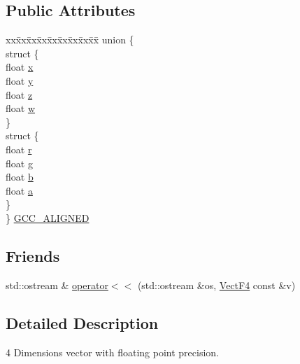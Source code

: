 \subsection*{Public Attributes}
\begin{DoxyCompactItemize}
\item 
\begin{tabbing}
xx\=xx\=xx\=xx\=xx\=xx\=xx\=xx\=xx\=\kill
union \{\\
\>struct \{\\
\>\>float \hyperlink{classVectF4_a0eae0277b6f418b6455a45030824c271}{x}\\
\>\>float \hyperlink{classVectF4_a9c3f2f0998e49e2039768ce8e64c1f91}{y}\\
\>\>float \hyperlink{classVectF4_a7fd880f9637591664713a14796cc06cd}{z}\\
\>\>float \hyperlink{classVectF4_a9e59fa7a69f80b5af58c3bf358ba7b4a}{w}\\
\>\} \\
\>struct \{\\
\>\>float \hyperlink{classVectF4_af832cf6038bfe6de1ca52cefed6f8184}{r}\\
\>\>float \hyperlink{classVectF4_ac988799edd7aa8a83196922ffad4cc5e}{g}\\
\>\>float \hyperlink{classVectF4_a13da3dbc083578f52865e368abd0c3dd}{b}\\
\>\>float \hyperlink{classVectF4_a542bc439b69669c1fe0599626e2f54ad}{a}\\
\>\} \\
\} \hyperlink{classVectF4_ad19036395e399964bae162f646997526}{GCC\_ALIGNED}\\

\end{tabbing}\end{DoxyCompactItemize}
\subsection*{Friends}
\begin{DoxyCompactItemize}
\item 
std\-::ostream \& \hyperlink{classVectF4_ae6606abac476b74b9ad5968e465178f8}{operator$<$$<$} (std\-::ostream \&os, \hyperlink{classVectF4}{Vect\-F4} const \&v)
\end{DoxyCompactItemize}


\subsection{Detailed Description}
4 Dimensions vector with floating point precision.


